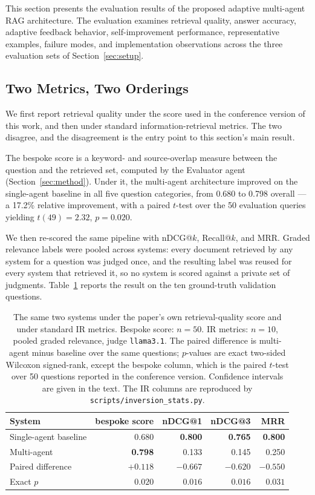 \documentclass[acmsmall,review,anonymous,screen]{acmart}
\begin{document}
This section presents the evaluation results of the proposed adaptive
multi-agent RAG architecture. The evaluation examines retrieval quality,
answer accuracy, adaptive feedback behavior, self-improvement
performance, representative examples, failure modes, and implementation
observations across the three evaluation sets of Section~\ref{sec:setup}.

\subsection{Two Metrics, Two Orderings}\label{sec:two-metrics}

We first report retrieval quality under the score used in the conference
version of this work, and then under standard information-retrieval metrics.
The two disagree, and the disagreement is the entry point to this section's
main result.

The bespoke score is a keyword- and source-overlap measure between the question
and the retrieved set, computed by the Evaluator agent
(Section~\ref{sec:method}). Under it, the multi-agent architecture improved on
the single-agent baseline in all five question categories, from 0.680 to 0.798
overall --- a 17.2\% relative improvement, with a paired $t$-test over the 50
evaluation queries yielding $t(49)=2.32$, $p=0.020$.

We then re-scored the same pipeline with nDCG@$k$, Recall@$k$, and MRR. Graded
relevance labels were pooled across systems: every document retrieved by any
system for a question was judged once, and the resulting label was reused for
every system that retrieved it, so no system is scored against a private set of
judgments. Table~\ref{tab:inversion} reports the result on the ten
ground-truth validation questions.

\begin{table}[t]
\caption{The same two systems under the paper's own retrieval-quality score and
under standard IR metrics. Bespoke score: $n=50$. IR metrics: $n=10$, pooled
graded relevance, judge \texttt{llama3.1}. The paired difference is
multi-agent minus baseline over the same questions; $p$-values are exact
two-sided Wilcoxon signed-rank, except the bespoke column, which is the paired
$t$-test over 50 questions reported in the conference version. Confidence
intervals are given in the text. The IR columns are reproduced by
\texttt{scripts/inversion\_stats.py}.}
\label{tab:inversion}
\begin{tabular}{lrrrr}
\toprule
System & bespoke score & nDCG@1 & nDCG@3 & MRR \\
\midrule
Single-agent baseline & 0.680 & \textbf{0.800} & \textbf{0.765} & \textbf{0.800} \\
Multi-agent           & \textbf{0.798} & 0.133 & 0.145 & 0.250 \\
\midrule
Paired difference & $+0.118$ & $-0.667$ & $-0.620$ & $-0.550$ \\
Exact $p$         & $0.020$ & $0.016$ & $0.016$ & $0.031$ \\
\bottomrule
\end{tabular}
\end{table}
\end{document}
